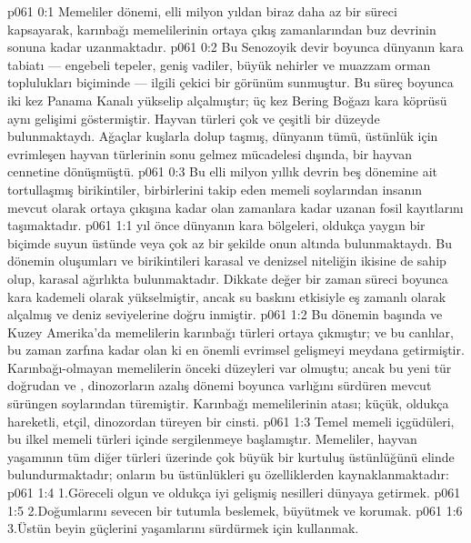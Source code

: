 \vs p061 0:1 Memeliler dönemi, elli milyon yıldan biraz daha az bir süreci kapsayarak, karınbağı memelilerinin ortaya çıkış zamanlarından buz devrinin sonuna kadar uzanmaktadır.
\vs p061 0:2 Bu Senozoyik devir boyunca dünyanın kara tabiatı --- engebeli tepeler, geniş vadiler, büyük nehirler ve muazzam orman toplulukları biçiminde --- ilgili çekici bir görünüm sunmuştur. Bu süreç boyunca iki kez Panama Kanalı yükselip alçalmıştır; üç kez Bering Boğazı kara köprüsü aynı gelişimi göstermiştir. Hayvan türleri çok ve çeşitli bir düzeyde bulunmaktaydı. Ağaçlar kuşlarla dolup taşmış, dünyanın tümü, üstünlük için evrimleşen hayvan türlerinin sonu gelmez mücadelesi dışında, bir hayvan cennetine dönüşmüştü.
\vs p061 0:3 Bu elli milyon yıllık devrin beş dönemine ait tortullaşmış birikintiler, birbirlerini takip eden memeli soylarından insanın mevcut olarak ortaya çıkışına kadar olan zamanlara kadar uzanan fosil kayıtlarını taşımaktadır.
\vs p061 1:1  yıl önce dünyanın kara bölgeleri, oldukça yaygın bir biçimde suyun üstünde veya çok az bir şekilde onun altında bulunmaktaydı. Bu dönemin oluşumları ve birikintileri karasal ve denizsel niteliğin ikisine de sahip olup, karasal ağırlıkta bulunmaktadır. Dikkate değer bir zaman süreci boyunca kara kademeli olarak yükselmiştir, ancak su baskını etkisiyle eş zamanlı olarak alçalmış ve deniz seviyelerine doğru inmiştir.
\vs p061 1:2 Bu dönemin başında ve Kuzey Amerika’da memelilerin karınbağı türleri  ortaya çıkmıştır; ve bu canlılar, bu zaman zarfına kadar olan ki en önemli evrimsel gelişmeyi meydana getirmiştir. Karınbağı\hyp{}olmayan memelilerin önceki düzeyleri var olmuştu; ancak bu yeni tür doğrudan ve , dinozorların azalış dönemi boyunca varlığını sürdüren mevcut sürüngen soylarından türemiştir. Karınbağı memelilerinin atası; küçük, oldukça hareketli, etçil, dinozordan türeyen bir cinsti.
\vs p061 1:3 Temel memeli içgüdüleri, bu ilkel memeli türleri içinde sergilenmeye başlamıştır. Memeliler, hayvan yaşamının tüm diğer türleri üzerinde çok büyük bir kurtuluş üstünlüğünü elinde bulundurmaktadır; onların bu üstünlükleri şu özelliklerden kaynaklanmaktadır:
\vs p061 1:4 1.\bibnobreakspace Göreceli olgun ve oldukça iyi gelişmiş nesilleri dünyaya getirmek.
\vs p061 1:5 2.\bibnobreakspace Doğumlarını sevecen bir tutumla beslemek, büyütmek ve korumak.
\vs p061 1:6 3.\bibnobreakspace Üstün beyin güçlerini yaşamlarını sürdürmek için kullanmak.
